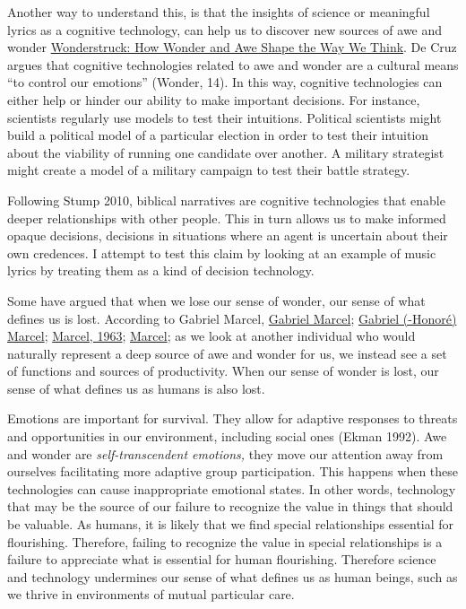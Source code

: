 \documentclass[
  letterpaper,
  DIV=11,
  numbers=noendperiod]{scrartcl}
\begin{document}
Another way to understand this, is that the insights of science or
meaningful lyrics as a cognitive technology, can help us to discover new
sources of awe and wonder
\href{https://app.notion.com/p/Wonderstruck-How-Wonder-and-Awe-Shape-the-Way-We-Think-3578935bcf8a811f827ae4e1b3d146e4?pvs=21}{Wonderstruck:
How Wonder and Awe Shape the Way We Think}. De Cruz argues that
cognitive technologies related to awe and wonder are a cultural means
``to control our emotions'' (Wonder, 14). In this way, cognitive
technologies can either help or hinder our ability to make important
decisions. For instance, scientists regularly use models to test their
intuitions. Political scientists might build a political model of a
particular election in order to test their intuition about the viability
of running one candidate over another. A military strategist might
create a model of a military campaign to test their battle strategy.

Following Stump 2010, biblical narratives are cognitive technologies
that enable deeper relationships with other people. This in turn allows
us to make informed opaque decisions, decisions in situations where an
agent is uncertain about their own credences. I attempt to test this
claim by looking at an example of music lyrics by treating them as a
kind of decision technology.

Some have argued that when we lose our sense of wonder, our sense of
what defines us is lost. According to Gabriel Marcel,
\href{https://app.notion.com/p/Gabriel-Marcel-34e8935bcf8a807591b4ec125449f587?pvs=21}{Gabriel
Marcel};
\href{https://app.notion.com/p/Gabriel-Honor-Marcel-34e8935bcf8a8186ae6bf6f7f42620c3?pvs=21}{Gabriel
(-Honoré) Marcel};
\href{https://app.notion.com/p/Marcel-1963-3398935bcf8a81749beec431c008b39e?pvs=21}{Marcel,
1963};
\href{https://app.notion.com/p/Marcel-3368935bcf8a8164b67de48748ff5b26?pvs=21}{Marcel};
as we look at another individual who would naturally represent a deep
source of awe and wonder for us, we instead see a set of functions and
sources of productivity. When our sense of wonder is lost, our sense of
what defines us as humans is also lost.

Emotions are important for survival. They allow for adaptive responses
to threats and opportunities in our environment, including social ones
(Ekman 1992). Awe and wonder are \emph{self-transcendent emotions,} they
move our attention away from ourselves facilitating more adaptive group
participation. This happens when these technologies can cause
inappropriate emotional states. In other words, technology that may be
the source of our failure to recognize the value in things that should
be valuable. As humans, it is likely that we find special relationships
essential for flourishing. Therefore, failing to recognize the value in
special relationships is a failure to appreciate what is essential for
human flourishing. Therefore science and technology undermines our sense
of what defines us as human beings, such as we thrive in environments of
mutual particular care.
\end{document}
